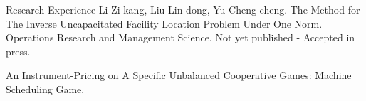 
\begin{rubric}{Research Experience}
Li Zi-kang, Liu Lin-dong, Yu Cheng-cheng. The Method for The Inverse Uncapacitated Facility Location Problem Under One Norm. Operations Research and Management Science. Not yet published - Accepted in press.

An Instrument-Pricing on A Specific Unbalanced Cooperative Games: Machine Scheduling Game.

\end{rubric}
